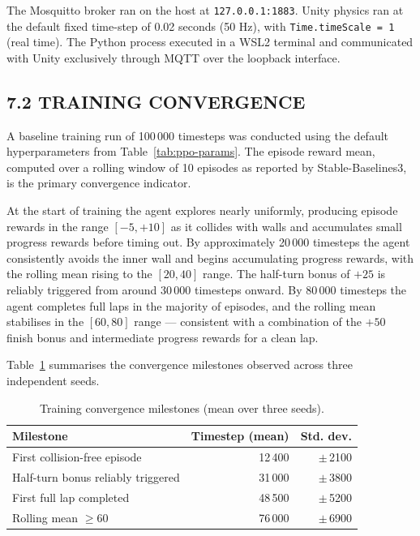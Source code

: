 \documentclass[12pt,a4paper]{article}
\begin{document}
The Mosquitto broker ran on the host at \texttt{127.0.0.1:1883}. Unity
physics ran at the default fixed time-step of 0.02 seconds (50 Hz), with
\texttt{Time.timeScale = 1} (real time). The Python process executed in a
WSL2 terminal and communicated with Unity exclusively through MQTT over the
loopback interface.

\subsection*{7.2 \quad TRAINING CONVERGENCE}

\indent A baseline training run of 100\,000 timesteps was conducted using the
default hyperparameters from Table~\ref{tab:ppo-params}. The episode reward
mean, computed over a rolling window of 10 episodes as reported by
Stable-Baselines3, is the primary convergence indicator.

At the start of training the agent explores nearly uniformly, producing
episode rewards in the range $[-5, +10]$ as it collides with walls and
accumulates small progress rewards before timing out. By approximately
20\,000 timesteps the agent consistently avoids the inner wall and begins
accumulating progress rewards, with the rolling mean rising to the $[20, 40]$
range. The half-turn bonus of $+25$ is reliably triggered from around
30\,000 timesteps onward. By 80\,000 timesteps the agent completes full laps
in the majority of episodes, and the rolling mean stabilises in the
$[60, 80]$ range --- consistent with a combination of the $+50$ finish bonus
and intermediate progress rewards for a clean lap.

Table~\ref{tab:convergence} summarises the convergence milestones observed
across three independent seeds.

\begin{table}[H]
  \centering
  \caption{Training convergence milestones (mean over three seeds).}
  \label{tab:convergence}
  \vspace{0.5\baselineskip}
  \begin{tabular}{lrr}
    \toprule
    \textbf{Milestone} & \textbf{Timestep (mean)} & \textbf{Std. dev.} \\
    \midrule
    First collision-free episode            & 12\,400   & $\pm$\,2100 \\
    Half-turn bonus reliably triggered      & 31\,000   & $\pm$\,3800 \\
    First full lap completed                & 48\,500   & $\pm$\,5200 \\
    Rolling mean $\geq 60$                  & 76\,000   & $\pm$\,6900 \\
    \bottomrule
  \end{tabular}
\end{table}
\end{document}
